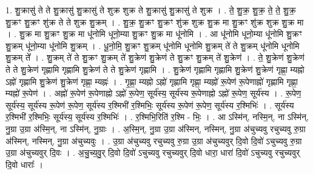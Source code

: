 \documentclass[17pt]{extarticle}
\begin{document}
1. शु॒क्रासु॑ ते ते शु॒क्रासु॑ शु॒क्रासु॑ ते शुक्र शुक्र ते शु॒क्रासु॑ शु॒क्रासु॑ ते शुक्र । . ते॒ शु॒क्र॒ शु॒क्र॒ ते॒ ते॒ शु॒क्र॒ शु॒क्रꣳ शु॒क्रꣳ शु॑क्र ते ते शुक्र शु॒क्रम् । . शु॒क्र॒ शु॒क्रꣳ शु॒क्रꣳ शु॑क्र शुक्र शु॒क्र मा शु॒क्रꣳ शु॑क्र शुक्र शु॒क्र मा । . शु॒क्र मा शु॒क्रꣳ शु॒क्र मा धू॑नोमि धूनो॒म्या शु॒क्रꣳ शु॒क्र मा धू॑नोमि । . आ धू॑नोमि धूनो॒म्या धू॑नोमि शु॒क्रꣳ शु॒क्रम् धू॑नो॒म्या धू॑नोमि शु॒क्रम् । . धू॒नो॒मि॒ शु॒क्रꣳ शु॒क्रम् धू॑नोमि धूनोमि शु॒क्रम् ते॑ ते शु॒क्रम् धू॑नोमि धूनोमि शु॒क्रम् ते᳚ । . शु॒क्रम् ते॑ ते शु॒क्रꣳ शु॒क्रम् ते॑ शु॒क्रेण॑ शु॒क्रेण॑ ते शु॒क्रꣳ शु॒क्रम् ते॑ शु॒क्रेण॑ । . ते॒ शु॒क्रेण॑ शु॒क्रेण॑ ते ते शु॒क्रेण॑ गृह्णामि गृह्णामि शु॒क्रेण॑ ते ते शु॒क्रेण॑ गृह्णामि । . शु॒क्रेण॑ गृह्णामि गृह्णामि शु॒क्रेण॑ शु॒क्रेण॑ गृह्णा॒ म्यह्नो ऽह्नो॑ गृह्णामि शु॒क्रेण॑ शु॒क्रेण॑ गृह्णा॒ म्यह्नः॑ । . गृ॒ह्णा॒ म्यह्नो ऽह्नो॑ गृह्णामि गृह्णा॒ म्यह्नो॑ रू॒पेण॑ रू॒पेणाह्नो॑ गृह्णामि गृह्णा॒ म्यह्नो॑ रू॒पेण॑ । . अह्नो॑ रू॒पेण॑ रू॒पेणाह्नो ऽह्नो॑ रू॒पेण॒ सूर्य॑स्य॒ सूर्य॑स्य रू॒पेणाह्नो ऽह्नो॑ रू॒पेण॒ सूर्य॑स्य । . रू॒पेण॒ सूर्य॑स्य॒ सूर्य॑स्य रू॒पेण॑ रू॒पेण॒ सूर्य॑स्य र॒श्मिभी॑ र॒श्मिभिः॒ सूर्य॑स्य रू॒पेण॑ रू॒पेण॒ सूर्य॑स्य र॒श्मिभिः॑ । . सूर्य॑स्य र॒श्मिभी॑ र॒श्मिभिः॒ सूर्य॑स्य॒ सूर्य॑स्य र॒श्मिभिः॑ । . र॒श्मिभि॒रिति॑ र॒श्मि - भिः॒ । . आ ऽस्मि॑न्, नस्मि॒न्, ना ऽस्मि॑न्, नु॒ग्रा उ॒ग्रा अ॑स्मि॒न्, ना ऽस्मि॑न्, नु॒ग्राः । . अ॒स्मि॒न्, नु॒ग्रा उ॒ग्रा अ॑स्मिन्, नस्मिन्, नु॒ग्रा अ॑चुच्यवु रचुच्यवु रु॒ग्रा अ॑स्मिन्, नस्मिन्, नु॒ग्रा अ॑चुच्यवुः । . उ॒ग्रा अ॑चुच्यवु रचुच्यवु रु॒ग्रा उ॒ग्रा अ॑चुच्यवुर् दि॒वो दि॒वो॑ ऽचुच्यवु रु॒ग्रा उ॒ग्रा अ॑चुच्यवुर् दि॒वः । . अ॒चु॒च्य॒वु॒र् दि॒वो दि॒वो॑ ऽचुच्यवु रचुच्यवुर् दि॒वो धारा॒ धारा॑ दि॒वो॑ ऽचुच्यवु रचुच्यवुर् दि॒वो धाराः᳚ । \newline
\end{document}
